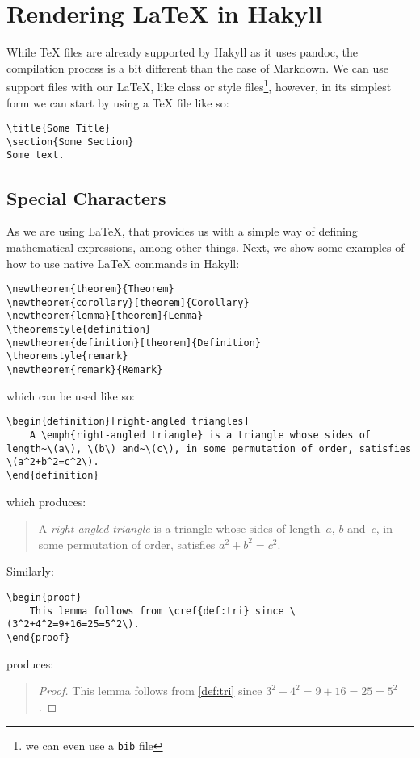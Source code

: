 \section{Rendering LaTeX in Hakyll}
While TeX files are already supported by Hakyll as it uses pandoc, the compilation process is a bit different than the case of Markdown.
We can use support files with our LaTeX, like class or style files\footnote{we can even use a \texttt{bib} file}, however, in its simplest form we can start by using a TeX file like so:
\begin{verbatim}
\title{Some Title}
\section{Some Section}
Some text.
\end{verbatim}

\subsection{Special Characters}
As we are using LaTeX, that provides us with a simple way of defining mathematical expressions, among other things.
Next, we show some examples of how to use native LaTeX commands in Hakyll:
\begin{verbatim}
\newtheorem{theorem}{Theorem}
\newtheorem{corollary}[theorem]{Corollary}
\newtheorem{lemma}[theorem]{Lemma}
\theoremstyle{definition}
\newtheorem{definition}[theorem]{Definition}
\theoremstyle{remark}
\newtheorem{remark}{Remark}
\end{verbatim}
which can be used like so:
\begin{verbatim}
\begin{definition}[right-angled triangles]
    A \emph{right-angled triangle} is a triangle whose sides of length~\(a\), \(b\) and~\(c\), in some permutation of order, satisfies \(a^2+b^2=c^2\).
\end{definition}
\end{verbatim}
which produces:
\begin{quote}
\begin{definition}
    A \emph{right-angled triangle} is a triangle whose sides of length~\(a\), \(b\) and~\(c\), in some permutation of order, satisfies \(a^2+b^2=c^2\).
\end{definition}
\end{quote}

Similarly:
\begin{verbatim}
\begin{proof}
    This lemma follows from \cref{def:tri} since \(3^2+4^2=9+16=25=5^2\).
\end{proof}
\end{verbatim}
produces:
\begin{quote}
\begin{proof}
    This lemma follows from \cref{def:tri} since \(3^2+4^2=9+16=25=5^2\).
\end{proof}
\end{quote}

